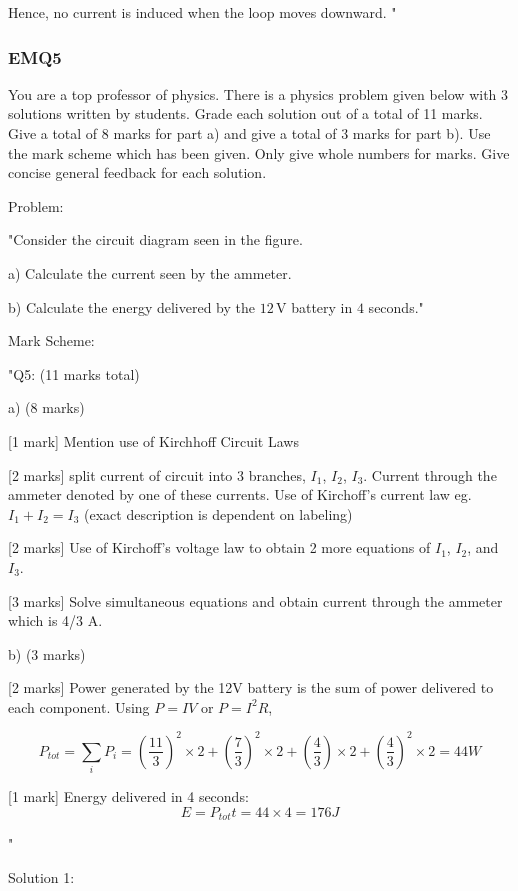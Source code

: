 Hence, no current is induced when the loop moves downward.
"

\subsubsection{EMQ5}

You are a top professor of physics. There is a physics problem given below with 3 solutions written by students. Grade each solution out of a total of 11 marks. Give a total of 8 marks for part a) and give a total of 3 marks for part b). Use the mark scheme which has been given. Only give whole numbers for marks. Give concise general feedback for each solution. 

Problem:

"Consider the circuit diagram seen in the figure. 

    a) Calculate the current seen by the ammeter.

    b) Calculate the energy delivered by the \(12\, \text{V}\) battery in \(4\) seconds."


Mark Scheme:

"{Q5: (11 marks total)}

a) (8 marks)

[1 mark] Mention use of Kirchhoff Circuit Laws 

[2 marks] split current of circuit into 3 branches, \( I_1 \), \( I_2 \), \( I_3 \). Current through the ammeter denoted by one of these currents. Use of Kirchoff’s current law eg. \( I_1 + I_2 = I_3 \) (exact description is dependent on labeling)

[2 marks] Use of Kirchoff’s voltage law to obtain 2 more equations of  \( I_1 \), \( I_2 \), and \( I_3 \).

[3 marks] Solve simultaneous equations and obtain current through the ammeter which is 4/3 A. 

b)  (3 marks)

[2 marks] Power generated by the 12V battery is the sum of power delivered to each component. Using \( P = IV \) or \( P = I^2 R \),

\[ P_{tot} = \sum_{i} P_i = \left ( \frac{11}{3} \right )^2 \times 2 + \left ( \frac{7}{3} \right )^2 \times 2 + \left ( \frac{4}{3} \right ) \times 2 + \left ( \frac{4}{3} \right )^2 \times 2 = 44 W \]

[1 mark] Energy delivered in 4 seconds: 
\[ E = P_{tot} t = 44 \times 4 = 176 J \]

"

Solution 1:

